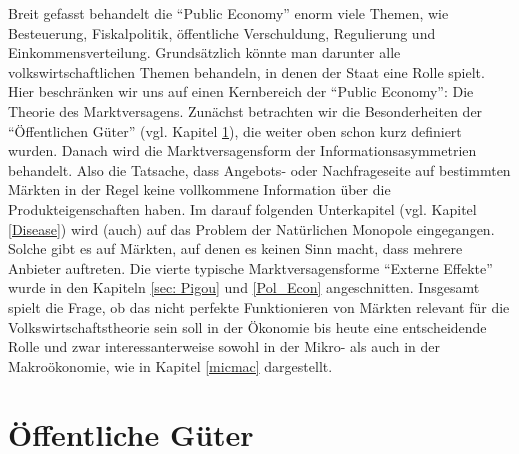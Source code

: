 Breit gefasst behandelt die "`Public Economy"' enorm viele Themen, wie Besteuerung, Fiskalpolitik, öffentliche Verschuldung, Regulierung und Einkommensverteilung. Grundsätzlich könnte man darunter alle volkswirtschaftlichen Themen behandeln, in denen der Staat eine Rolle spielt. Hier beschränken wir uns auf einen Kernbereich der "`Public Economy"': Die Theorie des Marktversagens. Zunächst betrachten wir die Besonderheiten der "`Öffentlichen Güter"' (vgl. Kapitel \ref{Offentliche Guter}), die weiter oben schon kurz definiert wurden. Danach wird die Marktversagensform der Informationsasymmetrien behandelt. Also die Tatsache, dass Angebots- oder Nachfrageseite auf bestimmten Märkten in der Regel keine vollkommene Information über die Produkteigenschaften haben. Im darauf folgenden Unterkapitel (vgl. Kapitel \ref{Disease}) wird (auch) auf das Problem der Natürlichen Monopole eingegangen. Solche gibt es auf Märkten, auf denen es keinen Sinn macht, dass mehrere Anbieter auftreten. Die vierte typische Marktversagensforme "`Externe Effekte"' wurde in den Kapiteln \ref{sec: Pigou} und \ref{Pol_Econ} angeschnitten. Insgesamt spielt die Frage, ob das nicht perfekte Funktionieren von Märkten relevant für die Volkswirtschaftstheorie sein soll in der Ökonomie bis heute eine entscheidende Rolle und zwar interessanterweise sowohl in der Mikro- als auch in der Makroökonomie, wie in Kapitel \ref{micmac} dargestellt.


\section{Öffentliche Güter}
\label{Offentliche Guter}

